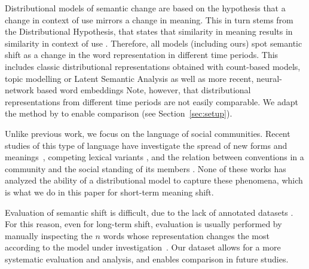 Distributional models of semantic change are based on the hypothesis
that a change in context of use mirrors a change in meaning.
This in turn stems from the Distributional Hypothesis, that states
that similarity in meaning results in similarity in context of use \cite{harris1954distributional}.
Therefore, all models (including ours) spot semantic shift as a change in the word representation in different time periods.
This includes classic distributional representations obtained with count-based models, topic
modelling or Latent Semantic Analysis
\cite{sagi2011tracing,jatowt2014framework,wijaya2011understanding,gulordava2011distributional}
as well as more recent, neural-network based word embeddings
\cite{kim2014temporal,kulkarni2015statistically,hamilton2016diachronic,azarbonyad2017words,szymanski2017temporal,yao2018dynamic} %
Note, however, that distributional representations from different time periods 
are not easily comparable.
We adapt the method by  to enable comparison
(see Section~\ref{sec:setup}).

Unlike previous work, we focus on the language of social communities.
Recent studies of this type of language have investigate the spread of new forms and meanings~\cite{del2017semantic,del2018road,stewart2018making}, 
competing lexical variants \cite{rotabi2017competition}, and the relation between conventions in a community and 
the social standing of its members \cite{danescu2013no}. 
None of these works has analyzed the ability of a distributional model to capture these phenomena, 
which is what we do in this paper for short-term meaning shift. 

Evaluation of semantic shift is difficult, due to the lack of
annotated datasets \cite{frermann2016bayesian}. For this reason, even for long-term shift, evaluation is usually performed by manually
inspecting the $n$ words whose representation changes the most
according to the model under investigation~\cite{hamilton2016diachronic,del2016tracing,kim2014temporal}.
Our dataset allows for a more systematic evaluation and analysis, and
enables comparison in future studies.

